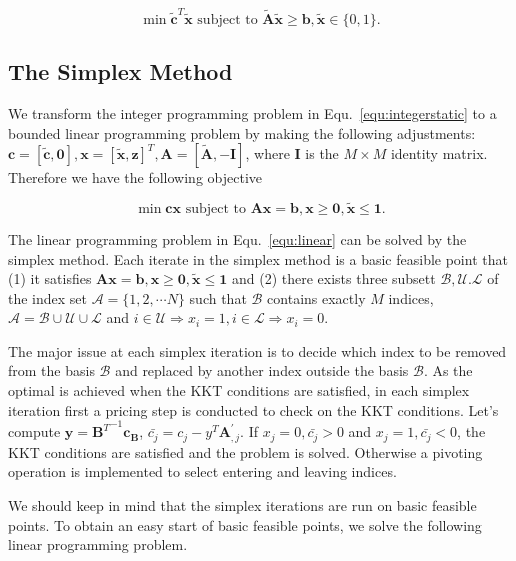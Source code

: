 \documentclass{llncs}
\begin{document}
\begin{equation}\label{equ:integerstatic}
\min \tilde{\mathbf{c}}^T\tilde{\mathbf{x}}\textrm{ subject to } \tilde{\mathbf{A}}\tilde{\mathbf{x}}\geq \mathbf{b}, \tilde{\mathbf{x}}\in \{0,1\}.
\end{equation}

\subsection{The Simplex Method}
We transform the integer programming problem in Equ.~\ref{equ:integerstatic} to a bounded linear programming problem by making the following adjustments: $\mathbf{c}=[\tilde{\mathbf{c}},\mathbf{0}],\mathbf{x}=[\tilde{\mathbf{x}},\mathbf{z}]^T,\mathbf{A}=[\tilde{\mathbf{A}},-\mathbf{I}]$, where $\mathbf{I}$ is the $M\times M$ identity matrix. Therefore we have the following objective

\begin{equation}\label{equ:linear}
\min \mathbf{cx} \textrm{ subject to } \mathbf{Ax} = \mathbf{b}, \mathbf{x}\geq \mathbf{0},\tilde{\mathbf{x}} \leq \mathbf{1}.
\end{equation}

The linear programming problem in Equ.~\ref{equ:linear} can be solved by the simplex method. Each iterate in the simplex method is a basic feasible point that (1) it satisfies $\mathbf{Ax} = \mathbf{b}, \mathbf{x}\geq \mathbf{0},\tilde{\mathbf{x}} \leq \mathbf{1}$ and (2) there exists three subsett $\mathcal{B,U.L}$ of the index set $\mathcal{A}=\{1,2,\cdots N\}$ such that $\mathcal{B}$ contains exactly $M$ indices, $\mathcal{A}=\mathcal{B}\cup \mathcal{U} \cup \mathcal{L}$ and $i \in \mathcal{U} \Rightarrow x_i=1,i \in \mathcal{L} \Rightarrow x_i=0$.

The major issue at each simplex iteration is to decide which index to be removed from the basis $\mathcal{B}$ and replaced by another index outside the basis $\mathcal{B}$.  As the optimal is achieved when the KKT conditions are satisfied, in each simplex iteration first  a pricing step is conducted to check on the KKT conditions.  Let's compute $\mathbf{y} = {\mathbf{B}^T}^{-1}\mathbf{c_B}$, $\bar{c_j} = c_j - y^T\mathbf{A}_{,j}^{'}$. If $x_j = 0, \bar{c_j} > 0$ and $x_j = 1,\bar{c_j} < 0$,  the KKT conditions are satisfied and the problem is solved. Otherwise a pivoting operation is implemented to select entering and leaving indices. 

We should keep in mind that the simplex iterations are run on basic feasible points. To obtain an easy start of basic feasible points, we solve the following linear programming problem.
\end{document}
